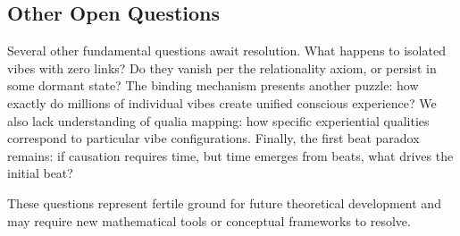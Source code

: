 
\subsection{Other Open Questions}

Several other fundamental questions await resolution. What happens to isolated vibes with zero links? Do they vanish per the relationality axiom, or persist in some dormant state? The binding mechanism presents another puzzle: how exactly do millions of individual vibes create unified conscious experience? We also lack understanding of qualia mapping: how specific experiential qualities correspond to particular vibe configurations. Finally, the first beat paradox remains: if causation requires time, but time emerges from beats, what drives the initial beat?

These questions represent fertile ground for future theoretical development and may require new mathematical tools or conceptual frameworks to resolve.
